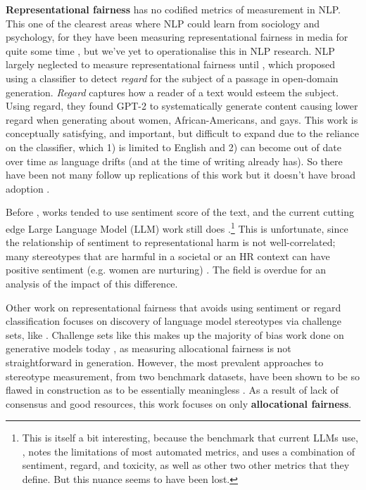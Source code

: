 \textbf{Representational fairness} has no codified metrics of measurement in NLP. This one of the clearest areas where NLP could learn from sociology and psychology, for they have been measuring representational fairness in media for quite some time \citep{dixon2017dangerous, black_rep_bias}, but we've yet to operationalise this in NLP research. NLP largely neglected to measure representational fairness until \citet{sheng-etal-2019-woman}, which proposed using a classifier to detect \textit{regard} for the subject of a passage in open-domain generation. \textit{Regard} captures how a reader of a text would esteem the subject. Using regard, they found GPT-2 \citep{radford2019language} to systematically generate content causing lower regard when generating about women, African-Americans, and gays. This work is conceptually satisfying, and important, but difficult to expand due to the reliance on the classifier, which 1) is limited to English and 2) can become out of date over time as language drifts (and at the time of writing already has). So there have been not many follow up replications of this work but it doesn't have broad adoption \citep{goldfarb-tarrant-etal-2023-prompt}.

Before \citet{sheng-etal-2019-woman}, works tended to use sentiment score of the text, and the current cutting edge Large Language Model (LLM) work still does \cite{llama2, jiang2024mixtral}.\footnote{This is itself a bit interesting, because the benchmark that current LLMs use, \citet{Dhamala_2021}, notes the limitations of most automated metrics, and uses a combination of sentiment, regard, and toxicity, as well as other two other metrics that they define. But this nuance seems to have been lost.} This is unfortunate, since the relationship of sentiment to representational harm is not well-correlated; many stereotypes that are harmful in a societal or an HR context can have positive sentiment (e.g. women are nurturing) \citep{fraser-etal-2021-understanding}. The field is overdue for an analysis of the impact of this difference.


Other work on representational fairness that avoids using sentiment or regard classification focuses on discovery of language model stereotypes via challenge sets, like . Challenge sets like this makes up the majority of bias work done on generative models today \citep{goldfarb-tarrant-etal-2023-prompt}, as measuring allocational fairness is not straightforward in generation. However, the most prevalent approaches to stereotype measurement, from two benchmark datasets, have been shown to be so flawed in construction as to be essentially meaningless \citep{blodgett-etal-2021-stereotyping}. As a result of lack of consensus and good resources, this work focuses on only \textbf{allocational fairness}.

